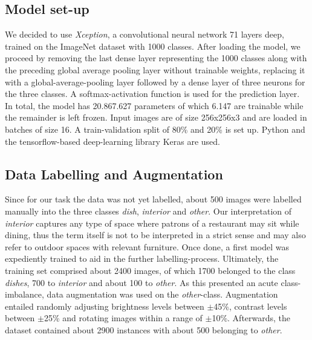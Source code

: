 \documentclass[11pt, oneside]{article}   	%
\begin{document}
\subsection{Model set-up}
We decided to use \textit{Xception}, a convolutional neural network 71 layers deep, trained on the ImageNet dataset with 1000 classes. After loading the model, we proceed by removing the last dense layer representing the 1000 classes along with the preceding global average pooling layer without trainable weights, replacing it with a global-average-pooling layer followed by a dense layer of three neurons for the three classes. A softmax-activation function is used for the prediction layer. In total, the model has 20.867.627 parameters of which 6.147 are trainable while the remainder is left frozen. Input images are of size 256x256x3 and are loaded in batches of size 16. A train-validation split of 80\% and 20\% is set up. Python and the tensorflow-based deep-learning library Keras are used.
\newline

\subsection{Data Labelling and Augmentation}
Since for our task the data was not yet labelled, about 500 images were labelled manually into the three classes \textit{dish}, \textit{interior} and \textit{other}. Our interpretation of \textit{interior} captures any type of space where patrons of a restaurant may sit while dining, thus the term itself is not to be interpreted in a strict sense and may also refer to outdoor spaces with relevant furniture. Once done, a first model was expediently trained to aid in the further labelling-process. Ultimately, the training set comprised about 2400 images, of which 1700 belonged to the class \textit{dishes}, 700 to \textit{interior} and about 100 to \textit{other}. As this presented an acute class-imbalance, data augmentation was used on the \textit{other}-class. Augmentation entailed randomly adjusting brightness levels between $\pm$45\%, contrast levels between $\pm$25\% and rotating images within a range of $\pm$10\%.
\newline
Afterwards, the dataset contained about 2900 instances with about 500 belonging to \textit{other}.
\end{document}
